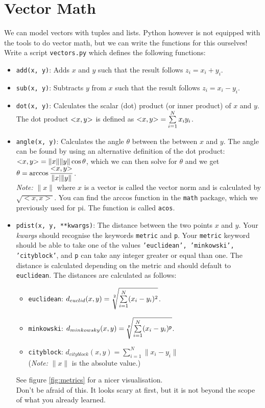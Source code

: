 \section{Vector Math}
We can model vectors with tuples and lists. Python however is not equipped with the tools to do vector math, but we can write the functions for this ourselves!\\
Write a script \texttt{vectors.py} which defines the following functions:
\begin{itemize}
  \item \texttt{add(x, y)}: Adds $x$ and $y$ such that the result follows $z_i = x_i + y_i$.

  \item \texttt{sub(x, y)}: Subtracts $y$ from $x$ such that the result follows $z_i = x_i - y_i$.

  \item \texttt{dot(x, y)}: Calculates the scalar (dot) product (or inner product) of $x$ and $y$. The dot product $\small{<} x,y\small{>}$ is defined as $\small{<} x,y\small{>} = \sum\limits_{i=1}^{N}x_iy_i$.

  \item \texttt{angle(x, y)}: Calculates the angle $\theta$ between the between $x$ and $y$. The angle can be found by using an alternative definition of the dot product: $\small{<} x,y\small{>} = \|x\|\|y\| \cos\theta$, which we can then solve for $\theta$ and we get $\theta = \arccos\dfrac{\small{<} x,y\small{>}}{\|x|\|y\|}$.\\
  \emph{Note:} $\|x\|$ where $x$ is a vector is called the vector norm and is calculated by $\sqrt{<x,x>}$. You can find the arccos function in the \texttt{math} package, which we previously used for pi. The function is called \texttt{acos}.

  \item \texttt{pdist(x, y, **kwargs)}: The distance between the two points $x$ and $y$. Your \textit{kwargs} should recognise the keywords \texttt{metric} and \texttt{p}. Your \texttt{metric} keyword should be able to take one of the values \texttt{'euclidean', 'minkowski', 'cityblock'}, and \texttt{p} can take any integer greater or equal than one. The distance is calculated depending on the metric and should default to \texttt{euclidean}. The distances are calculated as follows:
    \begin{itemize}
      \item \texttt{euclidean}: $d_{euclid} (x,y) = \sqrt[\uproot{2}2]{\sum\limits_{i=1}^N (x_i-y_i)^2}$.
      \item \texttt{minkowski}: $d_{minkowsky} (x,y) = \sqrt[\uproot{2}\texttt{p}]{\sum\limits_{i=1}^N (x_i-y_i)^\texttt{p}}$.
      \item \texttt{cityblock}: $d_{cityblock} (x,y) = \sum\limits_{i=1}^N \|x_i-y_i\|$\\
      (\emph{Note:} $\|x\|$ is the absolute value.)
    \end{itemize}
    See figure \ref{fig:metrics} for a nicer visualisation.\\
    Don't be afraid of this. It looks scary at first, but it is not beyond the scope of what you already learned.


\end{itemize}

